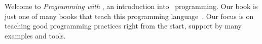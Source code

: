 \hsection{}%
%
%
Welcome to \emph{Programming with \python}, an introduction into \python\ programming.
Our book is just one of many books that teach this programming language~\cite{K2018EIPFEUU,A2002PC,H2023ABGTP3P,LH2015DSAAWP}.
Our focus is on teaching good programming practices right from the start, support by many examples and tools.%
%
%
%
%
%
\endhsection\endhsection%
%
